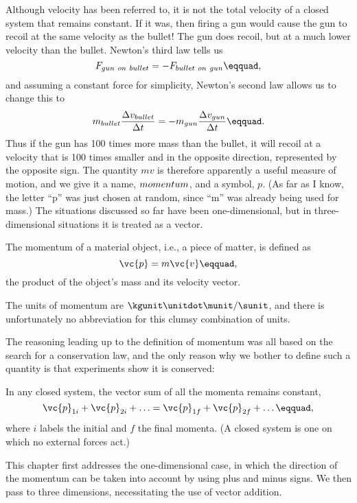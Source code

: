 Although velocity has been referred to, it is not the total
velocity of a closed system that remains constant. If it
was, then firing a gun would cause the gun to recoil at the
same velocity as the bullet! The gun does recoil, but at a
much lower velocity than the bullet. Newton's third law tells us
\begin{equation*}
                F_{gun\ on\ bullet}    =    - F_{bullet\ on\ gun}\eqquad,
\end{equation*}
and assuming a constant force for simplicity, Newton's
second law allows us to change this to
\begin{equation*}
        m_{bullet}\frac{\Delta v_{bullet}}{\Delta t}
            =    -m_{gun}\frac{\Delta v_{gun}}{\Delta t}\eqquad.
\end{equation*}
Thus if the gun has 100 times more mass than the bullet, it
will recoil at a velocity that is 100 times smaller and in
the opposite direction, represented by the opposite sign.
The quantity $mv$ is therefore apparently a useful
measure of motion, and we give it a name, $\index{momentum!defined}momentum$,
and a symbol, $p$. (As far as I know, the letter ``p'' was
just chosen at random, since ``m'' was already being used
for mass.) The situations discussed so far have been
one-dimensional, but in three-dimensional situations it is
treated as a vector.

\begin{important}
The momentum of a material object, i.e., a piece of
matter, is defined as
\begin{equation*}
                \vc{p}    =    m\vc{v}\eqquad,
\end{equation*}
the product of the object's mass and its velocity vector.
\end{important}
\noindent The units of momentum are $\kgunit\unitdot\munit/\sunit$, and there is unfortunately
no abbreviation for this clumsy combination of units.

The reasoning leading up to the definition of momentum was
all based on the search for a conservation law, and the only
reason why we bother to define such a quantity is that
experiments show it is conserved:

\begin{important}
In any closed system, the vector sum of all the momenta remains constant,
\begin{equation*}
                \vc{p}_{1i}+ \vc{p}_{2i}+ \ldots    =    \vc{p}_{1f} + \vc{p}_{2f} + \ldots\eqquad,
\end{equation*}
where $i$ labels the initial and $f$ the final momenta. (A
closed system is one on which no external forces act.)
\end{important}
\noindent This chapter first addresses the one-dimensional case, in
which the direction of the momentum can be taken into
account by using plus and minus signs. We then pass to three
dimensions, necessitating the use of vector addition.

